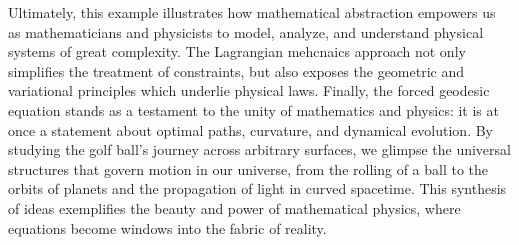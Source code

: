 Ultimately, this example illustrates how mathematical abstraction empowers us as mathematicians and physicists to model, analyze, and understand physical systems of great complexity. The Lagrangian mehcnaics approach not only simplifies the treatment of constraints, but also exposes the geometric and variational principles which underlie physical laws. Finally, the forced geodesic equation stands as a testament to the unity of mathematics and physics: it is at once a statement about optimal paths, curvature, and dynamical evolution. By studying the golf ball's journey across arbitrary surfaces, we glimpse the universal structures that govern motion in our universe, from the rolling of a ball to the orbits of planets and the propagation of light in curved spacetime. This synthesis of ideas exemplifies the beauty and power of mathematical physics, where equations become windows into the fabric of reality.
